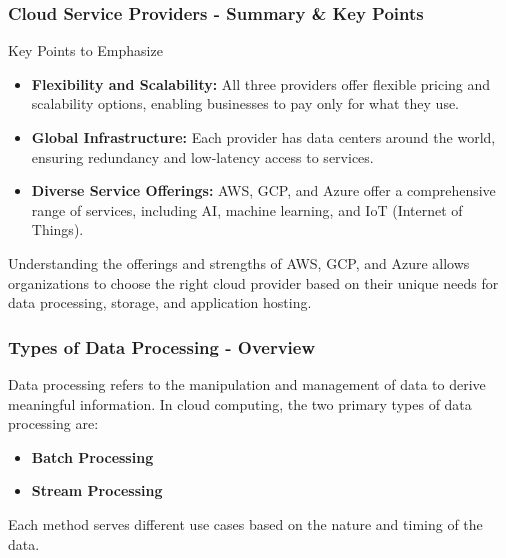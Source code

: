 \documentclass{beamer}
\begin{document}
\begin{frame}[fragile]
    \frametitle{Cloud Service Providers - Summary & Key Points}
    \begin{block}{Key Points to Emphasize}
        \begin{itemize}
            \item \textbf{Flexibility and Scalability:} All three providers offer flexible pricing and scalability options, enabling businesses to pay only for what they use.
            \item \textbf{Global Infrastructure:} Each provider has data centers around the world, ensuring redundancy and low-latency access to services.
            \item \textbf{Diverse Service Offerings:} AWS, GCP, and Azure offer a comprehensive range of services, including AI, machine learning, and IoT (Internet of Things).
        \end{itemize}
    \end{block}
    
    Understanding the offerings and strengths of AWS, GCP, and Azure allows organizations to choose the right cloud provider based on their unique needs for data processing, storage, and application hosting.
\end{frame}

\begin{frame}[fragile]
    \frametitle{Types of Data Processing - Overview}
    Data processing refers to the manipulation and management of data to derive meaningful information. In cloud computing, the two primary types of data processing are:
    \begin{itemize}
        \item \textbf{Batch Processing}
        \item \textbf{Stream Processing}
    \end{itemize}
    Each method serves different use cases based on the nature and timing of the data.
\end{frame}
\end{document}
